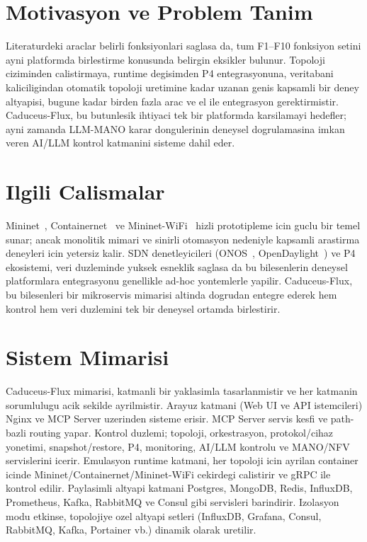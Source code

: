 \documentclass[conference]{IEEEtran}
\begin{document}
\section{Motivasyon ve Problem Tanim}
Literaturdeki araclar belirli fonksiyonlari saglasa da, tum F1--F10 fonksiyon setini ayni platformda birlestirme konusunda belirgin eksikler bulunur. Topoloji ciziminden calistirmaya, runtime degisimden P4 entegrasyonuna, veritabani kaliciligindan otomatik topoloji uretimine kadar uzanan genis kapsamli bir deney altyapisi, bugune kadar birden fazla arac ve el ile entegrasyon gerektirmistir. Caduceus-Flux, bu butunlesik ihtiyaci tek bir platformda karsilamayi hedefler; ayni zamanda LLM-MANO karar dongulerinin deneysel dogrulamasina imkan veren AI/LLM kontrol katmanini sisteme dahil eder.

\section{Ilgili Calismalar}
Mininet~\cite{mininet}, Containernet~\cite{containernet} ve Mininet-WiFi~\cite{mininet-wifi} hizli prototipleme icin guclu bir temel sunar; ancak monolitik mimari ve sinirli otomasyon nedeniyle kapsamli arastirma deneyleri icin yetersiz kalir. SDN denetleyicileri (ONOS~\cite{onos}, OpenDaylight~\cite{odl}) ve P4 ekosistemi, veri duzleminde yuksek esneklik saglasa da bu bilesenlerin deneysel platformlara entegrasyonu genellikle ad-hoc yontemlerle yapilir. Caduceus-Flux, bu bilesenleri bir mikroservis mimarisi altinda dogrudan entegre ederek hem kontrol hem veri duzlemini tek bir deneysel ortamda birlestirir.

\section{Sistem Mimarisi}
Caduceus-Flux mimarisi, katmanli bir yaklasimla tasarlanmistir ve her katmanin sorumlulugu acik sekilde ayrilmistir. Arayuz katmani (Web UI ve API istemcileri) Nginx ve MCP Server uzerinden sisteme erisir. MCP Server servis kesfi ve path-bazli routing yapar. Kontrol duzlemi; topoloji, orkestrasyon, protokol/cihaz yonetimi, snapshot/restore, P4, monitoring, AI/LLM kontrolu ve MANO/NFV servislerini icerir. Emulasyon runtime katmani, her topoloji icin ayrilan container icinde Mininet/Containernet/Mininet-WiFi cekirdegi calistirir ve gRPC ile kontrol edilir. Paylasimli altyapi katmani Postgres, MongoDB, Redis, InfluxDB, Prometheus, Kafka, RabbitMQ ve Consul gibi servisleri barindirir. Izolasyon modu etkinse, topolojiye ozel altyapi setleri (InfluxDB, Grafana, Consul, RabbitMQ, Kafka, Portainer vb.) dinamik olarak uretilir.
\end{document}
